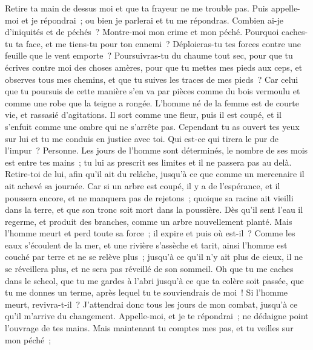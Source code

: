 \begin{multicols}{2}
Retire ta main de dessus moi et que ta frayeur ne me trouble pas.
Puis appelle-moi et je répondrai~; ou bien je parlerai et tu me répondras. 
Combien ai-je d'iniquités et de péchés~? Montre-moi mon crime et mon péché. 
Pourquoi caches-tu ta face, et me tiens-tu pour ton ennemi~?
Déploieras-tu tes forces contre une feuille que le vent emporte~? Poursuivras-tu du chaume tout sec,
pour que tu écrives contre moi des choses amères,
pour que tu mettes mes pieds aux ceps, et observes tous mes chemins, et que tu suives les traces de mes pieds~?
Car celui que tu poursuis de cette manière s'en va par pièces comme du bois vermoulu et comme une robe que la teigne a rongée. 
\VerseOne{}L'homme né de la femme est de courte vie, et rassasié d'agitations.
Il sort comme une fleur, puis il est coupé, et il s'enfuit comme une ombre qui ne s'arrête pas.
Cependant tu as ouvert tes yeux sur lui et tu me conduis en justice avec toi.
Qui est-ce qui tirera le pur de l'impur~? Personne.
Les jours de l'homme sont déterminés, le nombre de ses mois est entre tes mains~; tu lui as prescrit ses limites et il ne passera pas au delà.
Retire-toi de lui, afin qu'il ait du relâche, jusqu'à ce que comme un mercenaire il ait achevé sa journée.
Car si un arbre est coupé, il y a de l'espérance, et il poussera encore, et ne manquera pas de rejetons~; 
quoique sa racine ait vieilli dans la terre, et que son tronc soit mort dans la poussière.
Dès qu'il sent l'eau il regerme, et produit des branches, comme un arbre nouvellement planté. 
Mais l'homme meurt et perd toute sa force~; il expire et puis où est-il~?
Comme les eaux s'écoulent de la mer, et une rivière s'assèche et tarit,
 ainsi l'homme est couché par terre et ne se relève plus~; jusqu'à ce qu'il n'y ait plus de cieux, il ne se réveillera plus, et ne sera pas réveillé de son sommeil. 
Oh que tu me caches dans le scheol, que tu me gardes à l'abri jusqu'à ce que ta colère soit passée, que tu me donnes un terme, après lequel tu te souviendrais de moi~!
Si l'homme meurt, revivra-t-il~? J'attendrai donc tous les jours de mon combat, jusqu'à ce qu'il m'arrive du changement.
 Appelle-moi, et je te répondrai~; ne dédaigne point l'ouvrage de tes mains. 
Mais maintenant tu comptes mes pas, et tu veilles sur mon péché~;

\end{multicols}
